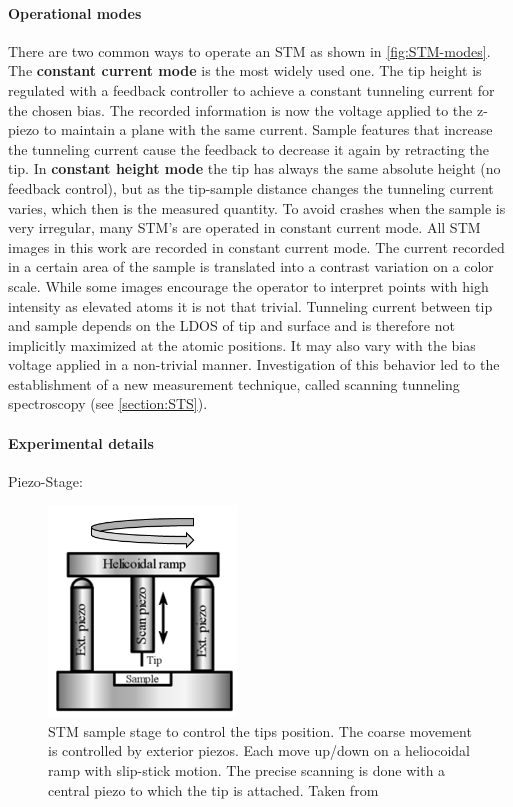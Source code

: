 \paragraph{Operational modes}
There are two common ways to operate an STM as shown in \autoref{fig:STM-modes}.
The \textbf{constant current mode} is the most widely used one. The tip height is regulated with a feedback controller to achieve a constant tunneling current for the chosen bias. The recorded information is now the voltage applied to the z-piezo to maintain a plane with the same current. Sample features that increase the tunneling current cause the feedback to decrease it again by retracting the tip.
In \textbf{constant height mode} the tip has always the same absolute height (no feedback control), but as the tip-sample distance changes the tunneling current varies, which then is the measured quantity.
To avoid crashes when the sample is very irregular, many STM's are operated in constant current mode. All STM images in this work are recorded in constant current mode.
The current recorded in a certain area of the sample is translated into a contrast variation on a color scale. While some images encourage the operator to interpret points with high intensity as elevated atoms it is not that trivial. Tunneling current between tip and sample depends on the LDOS of tip and surface and is therefore not implicitly maximized at the atomic positions. It may also vary with the bias voltage applied in a non-trivial manner. Investigation of this behavior led to the establishment of a new measurement technique, called scanning tunneling spectroscopy (see \autoref{section:STS}). 

\paragraph{Experimental details}
Piezo-Stage:
\begin{figure} \centering
	\includegraphics[width=5cm]{./images/STM-sketch-2}
	\caption{STM sample stage to control the tips position. The coarse movement is controlled by exterior piezos. Each move up/down on a heliocoidal ramp with slip-stick motion. The precise scanning is done with a central piezo to which the tip is attached. Taken from}
	\label{fig:stm-heliocoidal ramp}
\end{figure}


